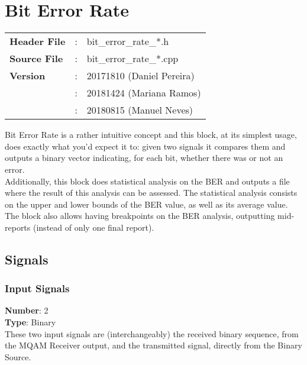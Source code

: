 \clearpage

\newenvironment{subs}
  {\begin{adjustwidth}{1em}{0pt}
  \nointerlineskip\leavevmode}
  {\end{adjustwidth}}


\section{Bit Error Rate}
\label{sec:bit_error_rate}
\begin{refsection}

\begin{tcolorbox}	
\begin{tabular}{p{2.75cm} p{0.2cm} p{10.5cm}} 	
\textbf{Header File}    &:& bit\_error\_rate\_*.h \\
\textbf{Source File}    &:& bit\_error\_rate\_*.cpp \\
\textbf{Version}        &:& 20171810 (Daniel Pereira)\\
                        &:& 20181424 (Mariana Ramos) \\
                        &:& 20180815 (Manuel Neves)\\
\end{tabular}
\end{tcolorbox}
Bit Error Rate is a rather intuitive concept and this block, at its simplest usage, does exactly what you'd expect it to: given two signals it compares them and outputs a binary vector indicating, for each bit, whether there was or not an error.\\
Additionally, this block does statistical analysis on the BER and outputs a file where the result of this analysis can be assessed.
The statistical analysis consists on the upper and lower bounds of the BER value, as well as its average value.\\
The block also allows having breakpoints on the BER analysis, outputting mid-reports (instead of only one final report).

\subsection*{Signals}

\subsubsection*{Input Signals}

\hspace*{0.5in}\textbf{Number}: 2\\
\hspace*{0.5in}\textbf{Type}: Binary
\\
These two input signals are (interchangeably) the received binary sequence, from the MQAM Receiver output, and the transmitted signal, directly from the Binary Source.

\end{refsection}
